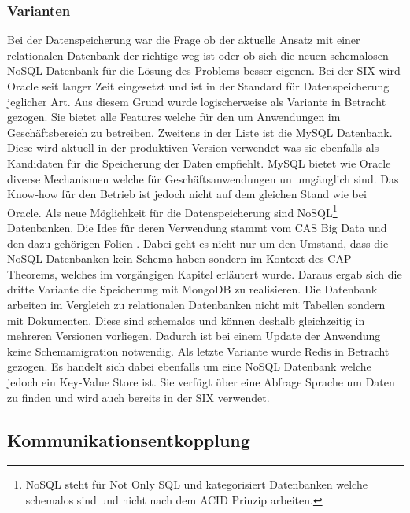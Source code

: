 \subsubsection{Varianten}
Bei der Datenspeicherung war die Frage ob der aktuelle Ansatz mit einer relationalen Datenbank der richtige weg ist oder ob sich die neuen schemalosen NoSQL Datenbank für die Lösung des Problems besser eigenen.\newline
Bei der SIX wird Oracle seit langer Zeit eingesetzt und ist in der Standard für Datenspeicherung jeglicher Art. Aus diesem Grund wurde logischerweise als Variante in Betracht gezogen. Sie bietet alle Features welche für den um Anwendungen im Geschäftsbereich zu betreiben.\newline
Zweitens in der Liste ist die MySQL Datenbank. Diese wird aktuell in der produktiven Version verwendet was sie ebenfalls als Kandidaten für die Speicherung der Daten empfiehlt.
MySQL bietet wie Oracle diverse Mechanismen welche für Geschäftsanwendungen un umgänglich sind. Das Know-how für den Betrieb ist jedoch nicht auf dem gleichen Stand wie bei Oracle.\newline
Als neue Möglichkeit für die Datenspeicherung sind NoSQL\footnote{NoSQL steht für Not Only SQL und kategorisiert Datenbanken welche schemalos sind und nicht nach dem ACID Prinzip arbeiten.} Datenbanken. Die Idee für deren Verwendung stammt vom CAS Big Data und den dazu gehörigen Folien \cite{nosqlintro}. Dabei geht es nicht nur um den Umstand, dass die NoSQL Datenbanken kein Schema haben sondern im Kontext des CAP-Theorems, welches im vorgängigen Kapitel erläutert wurde. 
Daraus ergab sich die dritte Variante die Speicherung mit MongoDB zu realisieren. Die Datenbank arbeiten im Vergleich zu relationalen Datenbanken nicht mit Tabellen sondern mit Dokumenten. Diese sind schemalos und können deshalb gleichzeitig in mehreren Versionen vorliegen. Dadurch ist bei einem Update der Anwendung keine Schemamigration notwendig.\newline
Als letzte Variante wurde Redis in Betracht gezogen. Es handelt sich dabei ebenfalls um eine NoSQL Datenbank welche jedoch ein Key-Value Store ist. Sie verfügt über eine Abfrage Sprache um Daten zu finden und wird auch bereits in der SIX verwendet.

\subsection{Kommunikationsentkopplung}

